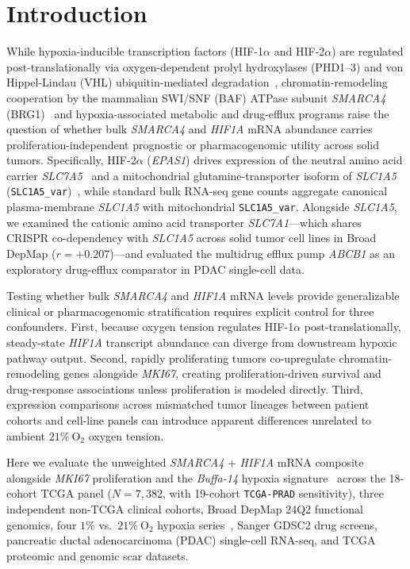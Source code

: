 \documentclass[11pt]{article}
\begin{document}
\section{Introduction}
While hypoxia-inducible transcription factors (HIF-1$\alpha$ and HIF-2$\alpha$) are regulated post-translationally via oxygen-dependent prolyl hydroxylases (PHD1--3) and von Hippel-Lindau (VHL) ubiquitin-mediated degradation~\cite{ivan2001,jaakkola2001}, chromatin-remodeling cooperation by the mammalian SWI/SNF (BAF) ATPase subunit \textit{SMARCA4} (BRG1)~\cite{kenneth2009,sena2013} and hypoxia-associated metabolic and drug-efflux programs raise the question of whether bulk \textit{SMARCA4} and \textit{HIF1A} mRNA abundance carries proliferation-independent prognostic or pharmacogenomic utility across solid tumors. Specifically, HIF-2$\alpha$ (\textit{EPAS1}) drives expression of the neutral amino acid carrier \textit{SLC7A5}~\cite{elorza2012} and a mitochondrial glutamine-transporter isoform of \textit{SLC1A5} (\texttt{SLC1A5\_var})~\cite{yoo2020}, while standard bulk RNA-seq gene counts aggregate canonical plasma-membrane \textit{SLC1A5} with mitochondrial \texttt{SLC1A5\_var}. Alongside \textit{SLC1A5}, we examined the cationic amino acid transporter \textit{SLC7A1}---which shares CRISPR co-dependency with \textit{SLC1A5} across solid tumor cell lines in Broad DepMap ($r = +0.207$)---and evaluated the multidrug efflux pump \textit{ABCB1} as an exploratory drug-efflux comparator in PDAC single-cell data.

Testing whether bulk \textit{SMARCA4} and \textit{HIF1A} mRNA levels provide generalizable clinical or pharmacogenomic stratification requires explicit control for three confounders. First, because oxygen tension regulates HIF-1$\alpha$ post-translationally, steady-state \textit{HIF1A} transcript abundance can diverge from downstream hypoxic pathway output. Second, rapidly proliferating tumors co-upregulate chromatin-remodeling genes alongside \textit{MKI67}, creating proliferation-driven survival and drug-response associations unless proliferation is modeled directly. Third, expression comparisons across mismatched tumor lineages between patient cohorts and cell-line panels can introduce apparent differences unrelated to ambient $21\%\ \text{O}_2$ oxygen tension.

Here we evaluate the unweighted \textit{SMARCA4} + \textit{HIF1A} mRNA composite alongside \textit{MKI67} proliferation and the \textit{Buffa-14} hypoxia signature~\cite{buffa2010} across the 18-cohort TCGA panel ($N = 7,382$, with 19-cohort \texttt{TCGA-PRAD} sensitivity), three independent non-TCGA clinical cohorts, Broad DepMap 24Q2 functional genomics, four $1\%$ vs.\ $21\%\ \text{O}_2$ hypoxia series~\cite{gse139673,gse145108,gse283995,gse300765}, Sanger GDSC2 drug screens, pancreatic ductal adenocarcinoma (PDAC) single-cell RNA-seq, and TCGA proteomic and genomic scar datasets.
\end{document}
